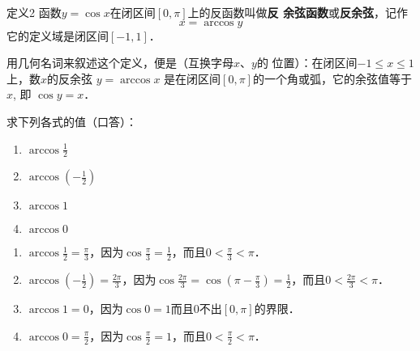 \begin{blk}{定义2 }
    函数$y=\cos x$在闭区间$[0,\pi]$上的反函数叫做\textbf{反
余弦函数}或\textbf{反余弦}，记作
\[x=\arccos y\]
它的定义域是闭区间$[-1,1]$．
\end{blk}

用几何名词来叙述这个定义，便是（互换字母$x$、$y$的
位置）：在闭区间$-1\le x\le 1$上，数$x$的反余弦
$y=\arccos x$
是在闭区间$[0,\pi]$的一个角或弧，它的余弦值等于$x$, 即
$\cos y=x$．

\begin{example}
    求下列各式的值（口答）：
    \begin{multicols}{2}
\begin{enumerate}
    \item $\arccos\frac{1}{2}$
    \item $\arccos\left(-\frac{1}{2}\right)$
    \item $\arccos1$
    \item $\arccos0$
\end{enumerate}
    \end{multicols}
\end{example}

\begin{solution}
\begin{enumerate}
    \item $\arccos\frac{1}{2}=\frac{\pi}{3}$，因为$\cos\frac{\pi}{3}=\frac{1}{2}$，而且$0<\frac{\pi}{3}<\pi$．
    \item $\arccos\left(-\frac{1}{2}\right)=\frac{2\pi}{3}$，因为$\cos\frac{2\pi}{3}=\cos\left(\pi-\frac{\pi}{3}\right)=\frac{1}{2}$，而且$0<\frac{2\pi}{3}<\pi$．
    \item $\arccos1=0$，因为$\cos 0=1$而且0不出$[0,\pi]$的界限．
    \item $\arccos0=\frac{\pi}{2}$，因为$\cos\frac{\pi}{2}=1$，而且$0<\frac{\pi}{2}<\pi$．
\end{enumerate}
\end{solution}

